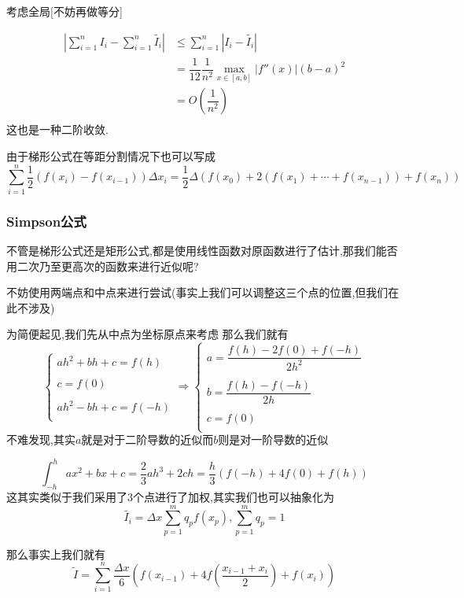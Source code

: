 \documentclass[11pt,hyperref,a4paper,UTF8]{ctexart}
\newcommand{\parameter}[1]{\left(#1\right)}
\newcommand{\abs}[1]{\left|#1\right|}
\begin{document}
\begin{CJK}{UTF8}{gkai}
考虑全局[不妨再做等分]

\[
\begin{aligned}
  \abs{\sum_{i = 1}^{n} I_i - \sum_{i = 1}^{n} \tilde{I_i}} &\leq \sum_{i = 1}^{n}|I_i - \tilde{I_i}|\\
  &= \dfrac{1}{12}\dfrac{1}{n^2} \max_{x\in[a,b]}|f''(x)| (b - a)^2 \\
  &= O(\dfrac{1}{n^2})\\
\end{aligned}
\]
这也是一种二阶收敛.

由于梯形公式在等距分割情况下也可以写成
\[\sum_{i = 1}^{n} \dfrac{1}{2} (f(x_{i}) - f(x_{i - 1}) )\Delta x_i = \dfrac{1}{2} \Delta (f(x_0) + 2(f(x_1) + \cdots + f(x_{n - 1})) + f(x_n))\]

\subsubsection{Simpson公式}
不管是梯形公式还是矩形公式,都是使用线性函数对原函数进行了估计,那我们能否用二次乃至更高次的函数来进行近似呢?

不妨使用两端点和中点来进行尝试(事实上我们可以调整这三个点的位置,但我们在此不涉及)

为简便起见,我们先从中点为坐标原点来考虑
那么我们就有
\[\begin{cases}
  ah^2 + bh + c = f(h)\\
\\
  c = f(0)\\
\\
  ah^2 -bh + c = f(-h)\\
\end{cases} \Rightarrow \begin{cases}
  a = \dfrac{f(h) - 2f(0) + f(-h)}{2h^2}\\
\\
  b = \dfrac{f(h) - f(-h)}{2h}\\
\\
  c = f(0)\\
\end{cases}\]
不难发现,其实$a$就是对于二阶导数的近似而$b$则是对一阶导数的近似

\[\int_{-h}^{h}ax^2 + bx + c = \dfrac{2}{3}ah^3 + 2ch = \dfrac{h}{3}(f(-h) + 4f(0) + f(h))\]
这其实类似于我们采用了3个点进行了加权,其实我们也可以抽象化为
\[\tilde{I_i} = \Delta x \sum_{p = 1}^{m}q_p f(x_p),\sum_{p = 1}^{m}q_p = 1\]

那么事实上我们就有
\[\tilde{I} = \sum_{i = 1}^{n}\dfrac{\Delta x}{6} \parameter{f(x_{i - 1}) + 4f\parameter{\dfrac{x_{i - 1} + x_i}{2}} + f(x_i)}\]


\end{CJK}
\end{document}
